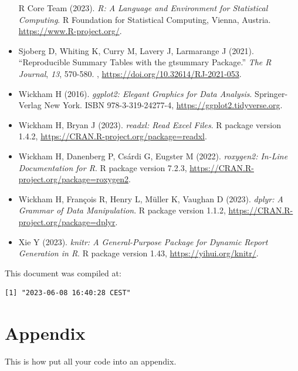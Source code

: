 \documentclass[
]{article}
\begin{document}
\begin{itemize}
  R Core Team (2023). \emph{R: A Language and Environment for
  Statistical Computing}. R Foundation for Statistical Computing,
  Vienna, Austria. \url{https://www.R-project.org/}.
\item
  Sjoberg D, Whiting K, Curry M, Lavery J, Larmarange J (2021).
  ``Reproducible Summary Tables with the gtsummary Package.'' \emph{The
  R Journal}, \emph{13}, 570-580. ,
  \url{https://doi.org/10.32614/RJ-2021-053}.
\item
  Wickham H (2016). \emph{ggplot2: Elegant Graphics for Data Analysis}.
  Springer-Verlag New York. ISBN 978-3-319-24277-4,
  \url{https://ggplot2.tidyverse.org}.
\item
  Wickham H, Bryan J (2023). \emph{readxl: Read Excel Files}. R package
  version 1.4.2, \url{https://CRAN.R-project.org/package=readxl}.
\item
  Wickham H, Danenberg P, Csárdi G, Eugster M (2022). \emph{roxygen2:
  In-Line Documentation for R}. R package version 7.2.3,
  \url{https://CRAN.R-project.org/package=roxygen2}.
\item
  Wickham H, François R, Henry L, Müller K, Vaughan D (2023).
  \emph{dplyr: A Grammar of Data Manipulation}. R package version 1.1.2,
  \url{https://CRAN.R-project.org/package=dplyr}.
\item
  Xie Y (2023). \emph{knitr: A General-Purpose Package for Dynamic
  Report Generation in R}. R package version 1.43,
  \url{https://yihui.org/knitr/}.
\end{itemize}

This document was compiled at:

\begin{verbatim}
[1] "2023-06-08 16:40:28 CEST"
\end{verbatim}

\hypertarget{appendix}{%
\section{Appendix}\label{appendix}}

This is how put all your code into an appendix.
\end{document}
